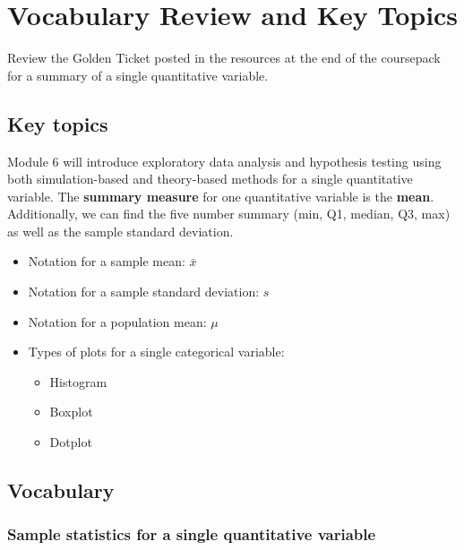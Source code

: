 \documentclass[
]{report}
\begin{document}
\section{Vocabulary Review and Key Topics}\label{vocabulary-review-and-key-topics-4}

Review the Golden Ticket posted in the resources at the end of the coursepack for a summary of a single quantitative variable.

\subsection{Key topics}\label{key-topics-5}

Module 6 will introduce exploratory data analysis and hypothesis testing using both simulation-based and theory-based methods for a single quantitative variable.
The \textbf{summary measure} for one quantitative variable is the \textbf{mean}.
Additionally, we can find the five number summary (min, Q1, median, Q3, max) as well as the sample standard deviation.

\begin{itemize}
\item
  Notation for a sample mean: \(\bar{x}\)
\item
  Notation for a sample standard deviation: \(s\)
\item
  Notation for a population mean: \(\mu\)
\item
  Types of plots for a single categorical variable:

  \begin{itemize}
  \item
    Histogram
  \item
    Boxplot
  \item
    Dotplot
  \end{itemize}
\end{itemize}

\subsection{Vocabulary}\label{vocabulary-4}

\subsubsection*{Sample statistics for a single quantitative variable}\label{sample-statistics-for-a-single-quantitative-variable}
\end{document}
